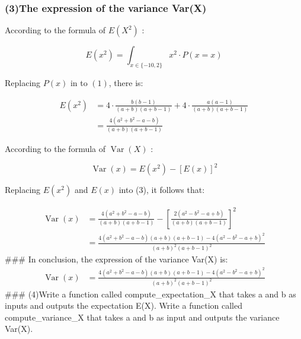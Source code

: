 \documentclass[
]{article}
\begin{document}
\subsubsection{(3)The expression of the variance
Var(X)}\label{the-expression-of-the-variance-varx}

According to the formula of \(E\left(X^{2}\right)\) :

\[
\begin{equation*}
E\left(x^{2}\right)=\int_{x \in\{-10,2\}} x^{2} \cdot P(x=x) \tag{1}
\end{equation*}
\]

Replacing \(P(x)\) in to \((1)\), there is:

\[
\begin{align*}
E\left(x^{2}\right) & =4 \cdot \frac{b(b-1)}{(a+b)(a+b-1)}+4 \cdot \frac{a(a-1)}{(a+b)(a+b-1)} \\
& =\frac{4\left(a^{2}+b^{2}-a-b\right)}{(a+b)(a+b-1)} \tag{2}
\end{align*}
\]

According to the formula of \(\operatorname{Var}(X)\) :

\[
\begin{equation*}
\operatorname{Var}(x)=E\left(x^{2}\right)-[E(x)]^{2} \tag{3}
\end{equation*}
\]

Replacing \(E\left(x^{2}\right)\) and \(E(x)\) into (3), it follows
that:

\[
\begin{aligned}
\operatorname{Var}(x) & =\frac{4\left(a^{2}+b^{2}-a-b\right)}{(a+b)(a+b-1)}-\left[\frac{2\left(a^{2}-b^{2}-a+b\right)}{(a+b)(a+b-1)}\right]^{2} \\
& =\frac{4\left(a^{2}+b^{2}-a-b\right)(a+b)(a+b-1)-4\left(a^{2}-b^{2}-a+b\right)^{2}}{(a+b)^{2}(a+b-1)^{2}}
\end{aligned}
\] \#\#\# In conclusion, the expression of the variance Var(X) is:\\
\[
\begin{aligned}
\operatorname{Var}(x) & =\frac{4\left(a^{2}+b^{2}-a-b\right)(a+b)(a+b-1)-4\left(a^{2}-b^{2}-a+b\right)^{2}}{(a+b)^{2}(a+b-1)^{2}}
\end{aligned}
\] \#\#\# (4)Write a function called compute\_expectation\_X that takes
a and b as inputs and outputs the expectation E(X). Write a function
called compute\_variance\_X that takes a and b as input and outputs the
variance Var(X).
\end{document}
